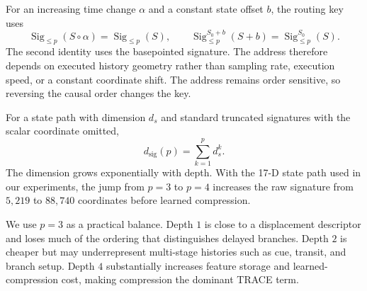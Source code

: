 \documentclass{article}
\begin{document}
For an increasing time change $\alpha$ and a constant state offset $b$, the routing key uses
\begin{equation}
    \operatorname{Sig}_{\leq p}(S\circ\alpha)
    =
    \operatorname{Sig}_{\leq p}(S),
    \qquad
    \operatorname{Sig}^{S_0+b}_{\leq p}(S+b)
    =
    \operatorname{Sig}^{S_0}_{\leq p}(S).
    \label{eq:signature_routing_invariance}
\end{equation}
The second identity uses the basepointed signature. The address therefore depends on executed history geometry rather than sampling rate, execution speed, or a constant coordinate shift. The address remains order sensitive, so reversing the causal order changes the key.

For a state path with dimension $d_s$ and standard truncated signatures with the scalar coordinate omitted,
\begin{equation}
    d_{\mathrm{sig}}(p)=\sum_{k=1}^{p} d_s^k .
    \label{eq:signature_dim}
\end{equation}
The dimension grows exponentially with depth. With the 17-D state path used in our experiments, the jump from $p{=}3$ to $p{=}4$ increases the raw signature from $5{,}219$ to $88{,}740$ coordinates before learned compression.

\begin{table}[H]
    \centering
    \caption{Signature depth scaling for $d_s{=}17$.}
    \label{tab:signature_depth_ablation}
    \setlength{\tabcolsep}{3.5pt}
    \renewcommand{\arraystretch}{1.05}
\end{table}

We use $p{=}3$ as a practical balance. Depth $1$ is close to a displacement descriptor and loses much of the ordering that distinguishes delayed branches. Depth $2$ is cheaper but may underrepresent multi-stage histories such as cue, transit, and branch setup. Depth $4$ substantially increases feature storage and learned-compression cost, making compression the dominant TRACE term.
\end{document}
